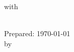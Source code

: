 

\begin{titlepage}

\vspace*{\fill} %

\begin{center}

{\huge \textbf{\companyname}}

{\Large \contracttitle}

\small{with}

{\LARGE\textbf{\clientname}}\\

\vspace{5ex}
Prepared: \today\\
\vspace{2ex}
\small{by}\\
\vspace{2ex}
\preparer\\
\vspace{2ex}

\companyaddress

\companyphone

\companyemail

\companywebsite

\companyGithub

\end{center}

\vspace*{\fill} %

\end{titlepage}


